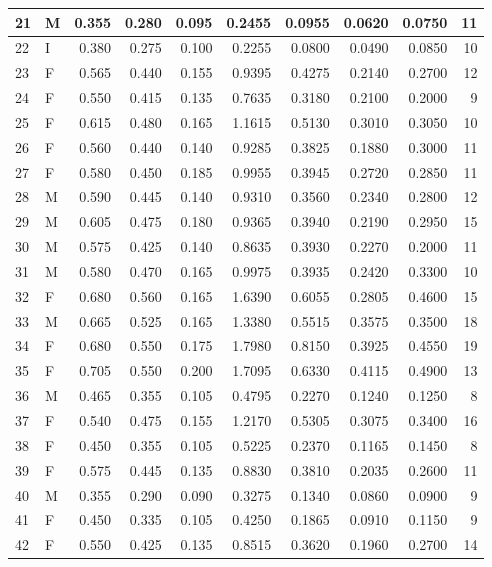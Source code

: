 \documentclass[9pt,twocolumn,twoside,]{pnas-new}
\begin{document}
\begin{tabular}{l|l|r|r|r|r|r|r|r|r}
\hline
21 & M & 0.355 & 0.280 & 0.095 & 0.2455 & 0.0955 & 0.0620 & 0.0750 & 11\\
\hline
22 & I & 0.380 & 0.275 & 0.100 & 0.2255 & 0.0800 & 0.0490 & 0.0850 & 10\\
\hline
23 & F & 0.565 & 0.440 & 0.155 & 0.9395 & 0.4275 & 0.2140 & 0.2700 & 12\\
\hline
24 & F & 0.550 & 0.415 & 0.135 & 0.7635 & 0.3180 & 0.2100 & 0.2000 & 9\\
\hline
25 & F & 0.615 & 0.480 & 0.165 & 1.1615 & 0.5130 & 0.3010 & 0.3050 & 10\\
\hline
26 & F & 0.560 & 0.440 & 0.140 & 0.9285 & 0.3825 & 0.1880 & 0.3000 & 11\\
\hline
27 & F & 0.580 & 0.450 & 0.185 & 0.9955 & 0.3945 & 0.2720 & 0.2850 & 11\\
\hline
28 & M & 0.590 & 0.445 & 0.140 & 0.9310 & 0.3560 & 0.2340 & 0.2800 & 12\\
\hline
29 & M & 0.605 & 0.475 & 0.180 & 0.9365 & 0.3940 & 0.2190 & 0.2950 & 15\\
\hline
30 & M & 0.575 & 0.425 & 0.140 & 0.8635 & 0.3930 & 0.2270 & 0.2000 & 11\\
\hline
31 & M & 0.580 & 0.470 & 0.165 & 0.9975 & 0.3935 & 0.2420 & 0.3300 & 10\\
\hline
32 & F & 0.680 & 0.560 & 0.165 & 1.6390 & 0.6055 & 0.2805 & 0.4600 & 15\\
\hline
33 & M & 0.665 & 0.525 & 0.165 & 1.3380 & 0.5515 & 0.3575 & 0.3500 & 18\\
\hline
34 & F & 0.680 & 0.550 & 0.175 & 1.7980 & 0.8150 & 0.3925 & 0.4550 & 19\\
\hline
35 & F & 0.705 & 0.550 & 0.200 & 1.7095 & 0.6330 & 0.4115 & 0.4900 & 13\\
\hline
36 & M & 0.465 & 0.355 & 0.105 & 0.4795 & 0.2270 & 0.1240 & 0.1250 & 8\\
\hline
37 & F & 0.540 & 0.475 & 0.155 & 1.2170 & 0.5305 & 0.3075 & 0.3400 & 16\\
\hline
38 & F & 0.450 & 0.355 & 0.105 & 0.5225 & 0.2370 & 0.1165 & 0.1450 & 8\\
\hline
39 & F & 0.575 & 0.445 & 0.135 & 0.8830 & 0.3810 & 0.2035 & 0.2600 & 11\\
\hline
40 & M & 0.355 & 0.290 & 0.090 & 0.3275 & 0.1340 & 0.0860 & 0.0900 & 9\\
\hline
41 & F & 0.450 & 0.335 & 0.105 & 0.4250 & 0.1865 & 0.0910 & 0.1150 & 9\\
\hline
42 & F & 0.550 & 0.425 & 0.135 & 0.8515 & 0.3620 & 0.1960 & 0.2700 & 14\\

\end{tabular}
\end{document}
